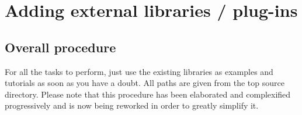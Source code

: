 \chapter{Adding external libraries / plug-ins}

\section{Overall procedure}

For all the tasks to perform, just use the existing libraries as
examples and tutorials as soon as you have a doubt. All paths are given
from the top source directory. Please note that this procedure has been
elaborated and complexified progressively and is now being reworked in
order to greatly simplify it.
\\

